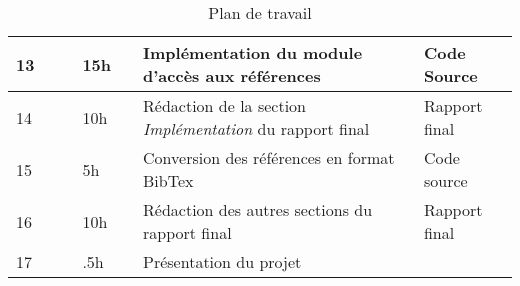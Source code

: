 \documentclass[12pt]{report}
\begin{document}
\begin{table}
\begin{tabular}{| p{.5cm} | p{2cm} | p{2cm} | p{1.2cm} | p{1.5cm} | p{3.5cm} | p{3.5cm} |}
    \hline
    13 & & & 15h & & Implémentation du module d'accès aux références & Code Source \\
    \hline
    14 & & & 10h & & Rédaction de la section \emph{Implémentation} du rapport final & Rapport final \\
    \hline
    15 & & & 5h & & Conversion des références en format BibTex & Code source \\ 
    \hline
    16 & & & 10h & & Rédaction des autres sections du rapport final & Rapport final \\
    \hline
    17 & & & .5h & & Présentation du projet & \\
    \hline
\end{tabular}
\caption{Plan de travail}
\end{table}

\nocite{rubylang}
\nocite{jinja2}
\nocite{makotemplates}
\nocite{pybtex}

\end{document}
